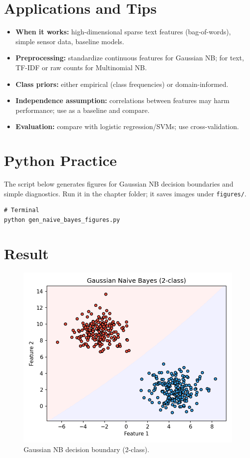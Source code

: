 \documentclass[11pt]{article}
\begin{document}
\section{Applications and Tips}
\begin{itemize}
  \item \textbf{When it works:} high-dimensional sparse text features (bag-of-words), simple sensor data, baseline models.
  \item \textbf{Preprocessing:} standardize continuous features for Gaussian NB; for text, TF-IDF or raw counts for Multinomial NB.
  \item \textbf{Class priors:} either empirical (class frequencies) or domain-informed.
  \item \textbf{Independence assumption:} correlations between features may harm performance; use as a baseline and compare.
  \item \textbf{Evaluation:} compare with logistic regression/SVMs; use cross-validation.
\end{itemize}

\section{Python Practice}
The script below generates figures for Gaussian NB decision boundaries and simple diagnostics. Run it in the chapter folder; it saves images under \texttt{figures/}.

\begin{lstlisting}[style=code,caption={Generate Naive Bayes figures},label={lst:genfigs}]
# Terminal
python gen_naive_bayes_figures.py
\end{lstlisting}



\section{Result}
\begin{figure}[H]
  \centering
  \includegraphics[width=0.9\linewidth]{gnb_decision_boundary_2class.png}
  \caption{Gaussian NB decision boundary (2-class).}
  \label{fig:gnb2}
\end{figure}
\FloatBarrier
\end{document}
